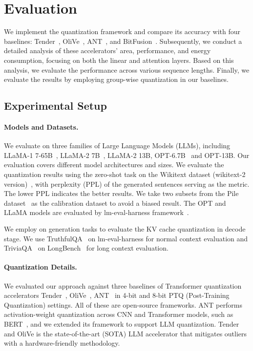 \section{Evaluation}
\label{sec:evaluation}




We implement the \proj quantization framework and compare its accuracy with four baselines:  Tender~\cite{lee2024tenderacceleratinglargelanguage}, OliVe~\cite{guo2023olive}, ANT~\cite{guo2022ant}, and BitFusion~\cite{sharma2018bit}.
Subsequently, we conduct a detailed analysis of these accelerators' area, performance, and energy consumption, focusing on both the linear and attention layers.
Based on this analysis, we evaluate the performance across various sequence lengths. 
Finally, we evaluate the results by employing group-wise quantization in our baselines.

\subsection{Experimental Setup}
\label{sec:eval_setup}
\paragraph{Models and Datasets. } 
We evaluate \proj on three families of Large Language Models (LLMs), including LLaMA-1 7-65B~\cite{touvron2023llama}, LLaMA-2 7B~\cite{touvron2023llama2}, LLaMA-2 13B, OPT-6.7B~\cite{zhang2022opt} and OPT-13B.
Our evaluation covers different model architectures and sizes.
We evaluate the quantization results using the zero-shot task on the Wikitext dataset (wikitext-2 version)~\cite{merity2016pointer}, with perplexity (PPL) of the generated sentences serving as the metric.
The lower PPL indicates the better results.
We take two subsets from the Pile dataset\mbox{~\cite{gao2020pile}} as the calibration dataset to avoid a biased result.
The OPT and LLaMA models are evaluated by lm-eval-harness framework~\cite{eval-harness}.

We employ \proj on generation tasks to evaluate the KV cache quantization in decode stage.
We use TruthfulQA~\cite{lin2022truthfulqameasuringmodelsmimic} on lm-eval-harness for normal context evaluation and TriviaQA~\cite{joshi2017triviaqalargescaledistantly} on LongBench~\cite{bai2024longbenchbilingualmultitaskbenchmark} for long context evaluation.

\paragraph{Quantization Details. }
We evaluated our approach against three baselines of Transformer quantization accelerators Tender~\cite{lee2024tenderacceleratinglargelanguage}, OliVe~\cite{guo2023olive}, ANT~\cite{guo2022ant} in 4-bit and 8-bit PTQ (Post-Training Quantization) settings.
All of these are open-source frameworks.
ANT performs activation-weight quantization across CNN and Transformer models, such as BERT~\cite{devlin2018bert}, and we extended its framework to support LLM quantization.
Tender and OliVe is the state-of-the-art (SOTA) LLM accelerator that mitigates outliers with a hardware-friendly methodology.

